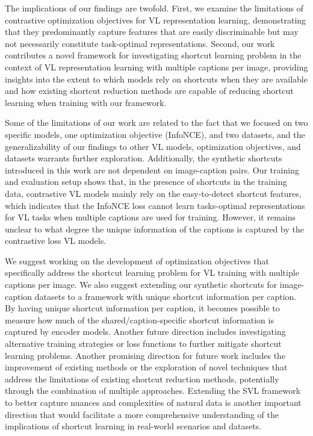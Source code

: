  The implications of our findings are twofold.
First, we examine the limitations of contrastive optimization objectives for \ac{VL} representation learning, demonstrating that they predominantly capture features that are easily discriminable but may not necessarily constitute task-optimal representations.
Second, our work contributes a novel framework for investigating shortcut learning problem in the context of \ac{VL} representation learning with multiple captions per image, providing insights into the extent to which models rely on shortcuts when they are available and how existing shortcut reduction methods are capable of reducing shortcut learning when training with our framework.

 Some of the limitations of our work are related to the fact that we focused on two specific models, one optimization objective (InfoNCE), and two datasets, and the generalizability of our findings to other \ac{VL} models, optimization objectives, and datasets warrants further exploration. 
Additionally, the synthetic shortcuts introduced in this work are not dependent on image-caption pairs. 
Our training and evaluation setup shows that, in the presence of shortcuts in the training data, contrastive \ac{VL} models mainly rely on the easy-to-detect shortcut features, which indicates that the InfoNCE loss cannot learn tasks-optimal representations for \ac{VL} tasks when multiple captions are used for training.
However, it remains unclear to what degree the unique information of the captions is captured by the contrastive loss \ac{VL} models.

We suggest working on the development of optimization objectives that specifically address the shortcut learning problem for \ac{VL} training with multiple captions per image.
We also suggest extending our synthetic shortcuts for image-caption datasets to a framework with unique shortcut information per caption. 
By having unique shortcut information per caption, it becomes possible to measure how much of the shared/caption-specific shortcut information is captured by encoder models.
Another future direction includes investigating alternative training strategies or loss functions to further mitigate shortcut learning problems. 
Another promising direction for future work includes the improvement of existing methods or the exploration of novel techniques that address the limitations of existing shortcut reduction methods, potentially through the combination of multiple approaches.
Extending the SVL framework to better capture nuances and complexities of natural data is another important  direction that would facilitate a more comprehensive understanding of the implications of shortcut learning in real-world scenarios and datasets.
